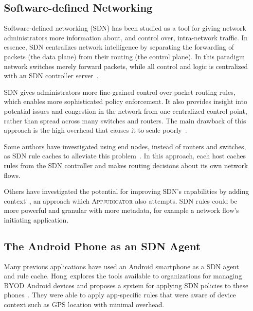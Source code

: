 \subsection{Software-defined Networking}
\label{sec:software-defined-networking}

Software-defined networking (SDN) has been studied as a tool for giving network
administrators more information about, and control over, intra-network traffic.
In essence, SDN centralizes network intelligence by separating the forwarding of
packets (the data plane) from their routing (the control plane). In this
paradigm network switches merely forward packets, while all control and logic is
centralized with an SDN controller server~\cite{kim2013}.

SDN gives administrators more fine-grained control over packet routing rules,
which enables more sophisticated policy enforcement. It also provides insight
into potential issues and congestion in the network from one centralized control
point, rather than spread across many switches and routers. The main drawback of
this approach is the high overhead that causes it to scale
poorly~\cite{benzekki2016}.

Some authors have investigated using end nodes, instead of routers and switches,
as SDN rule caches to alleviate this problem~\cite{taylor2017, chuluundorj2019}.
In this approach, each host caches rules from the SDN controller and makes
routing decisions about its own network flows.

Others have investigated the potential for improving SDN's capabilities by
adding context~\cite{yang2015}, an approach which \textsc{Appjudicator} also
attempts. SDN rules could be more powerful and granular with more metadata, for
example a network flow's initiating application.

\subsection{The Android Phone as an SDN Agent}
\label{sec:the-android-phone-as-an-sdn-agent}

Many previous applications have used an Android smartphone as a SDN agent and
rule cache. Hong~\etal explores the tools available to organizations for
managing BYOD Android devices and proposes a system for applying SDN policies to
these phones~\cite{hong2016}. They were able to apply app-specific rules that
were aware of device context such as GPS location with minimal overhead.

